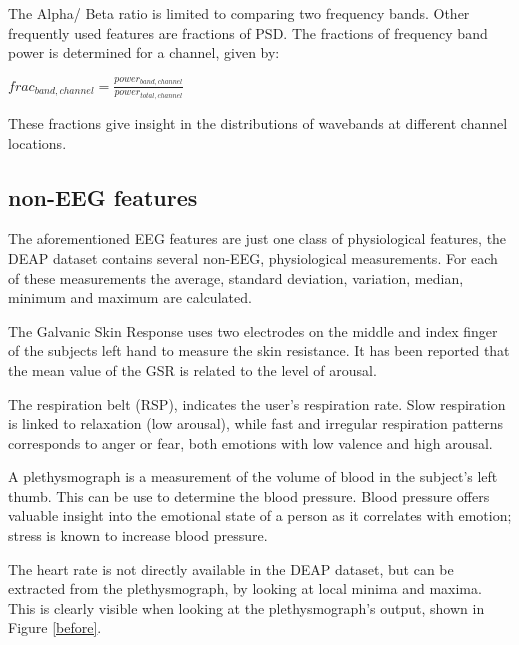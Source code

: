 \npar

The Alpha/ Beta ratio is limited to comparing two frequency bands. Other frequently used features are fractions of PSD. The fractions of frequency band power is determined for a channel, given by:

\begin{center}
$frac_{band,channel} = \frac{power_{band,channel}}{power_{total,channel}}$
\end{center}

These fractions give insight in the distributions of wavebands at different channel locations.

\subsection{non-EEG features}
The aforementioned EEG features are just one class of physiological features, the DEAP dataset contains several non-EEG, physiological measurements\citep{DEAP}. For each of these measurements the average, standard deviation, variation, median, minimum and maximum are calculated.

\npar

The Galvanic Skin Response  uses two electrodes on the middle and index finger of the subjects left hand to measure the skin resistance. It has been reported that the mean value of the GSR is related to the level of arousal\citep{GSR, DEAP}.

\npar

The respiration belt (RSP), indicates the user's respiration rate. Slow respiration is linked to relaxation (low arousal), while fast and irregular respiration patterns corresponds to anger or fear, both emotions with low valence and high arousal\citep{DEAP}.

\npar

A plethysmograph is a measurement of the volume of blood in the subject's left thumb. This can be use to determine the blood pressure. Blood pressure offers valuable insight into the emotional state of a person as it correlates with emotion; stress is known to increase blood pressure\citep{DEAP}.

\npar

The heart rate is not directly available in the DEAP dataset, but can be extracted from the plethysmograph, by looking at local minima and maxima\citep{DEAP}. This is clearly visible when looking at the plethysmograph's output, shown in Figure \ref{before}.

